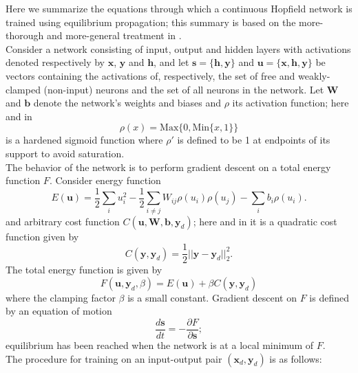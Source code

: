 \documentclass[format=sigconf]{acmart}
\newcommand{\mtx}[1]{\bm{#1}}
\newcommand{\npar}{\\\indent}
\begin{document}
Here we summarize the equations through which a continuous Hopfield network is trained using equilibrium propagation; this summary is based on the more-thorough and more-general treatment in \cite{scellier17}.
\npar
Consider a network consisting of input, output and hidden layers with activations denoted respectively by $\mtx{x}$, $\mtx{y}$ and $\mtx{h}$, and let $\mtx{s}=\{\mtx{h},\mtx{y}\}$ and $\mtx{u}=\{\mtx{x}, \mtx{h},\mtx{y}\}$ be vectors containing the activations of, respectively, the set of free and weakly-clamped (non-input) neurons and the set of all neurons in the network. Let $\mtx{W}$ and $\mtx{b}$ denote the network's weights and biases and $\rho$ its activation function; here and in \cite{scellier17}
\begin{equation}
\label{eqn:hardened_sigmoid}
\rho(x)=\text{Max}\{0, \text{Min}\{x, 1\}\} 
\end{equation} is a hardened sigmoid function
where $\rho'$ is defined to be 1 at endpoints of its support to avoid saturation.
\npar
The behavior of the network is to perform gradient descent on a total energy function $F$. Consider energy function
\begin{equation}
E(\mtx{u})=\frac{1}{2}\sum_iu_i^2-\frac{1}{2}\sum_{i\neq j}W_{ij}\rho(u_i)\rho(u_j)-\sum_ib_i\rho(u_i).
\end{equation}
and arbitrary cost function $C(\mtx{u}, \mtx{W}, \mtx{b}, \mtx{y}_d)$; here and in \cite{scellier17} it is a quadratic cost function given by
\begin{equation}
\label{eqn:cost}
C(\mtx{y},\mtx{y}_d)=\frac{1}{2}||\mtx{y}-\mtx{y}_d||_2^2.
\end{equation}
The total energy function is given by
\begin{equation}
F(\mtx{u},\mtx{y}_d, \beta)=E(\mtx{u})+\beta C(\mtx{y},\mtx{y}_d)
\end{equation}
where the clamping factor $\beta$ is a small constant. Gradient descent on $F$ is defined by an equation of motion
\begin{equation}
\label{eqn:dynamics}
\frac{d\mtx{s}}{dt}=-\frac{\partial F}{\partial \mtx{s}};
\end{equation}
equilibrium has been reached when the network is at a local minimum of $F$.
\npar
The procedure for training on an input-output pair $(\mtx{x}_d,\mtx{y}_d)$ is as follows:
\end{document}
